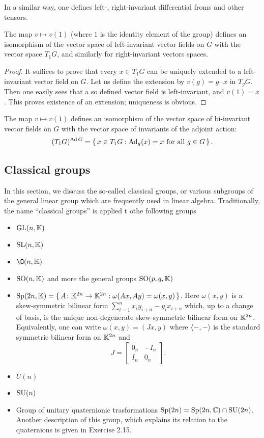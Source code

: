 In a similar way, one defines left-, right-invariant differential froms and
other tensors.

\begin{theorem}
  The map $v\mapsto v(1)$ (where $1$ is the identity element of the
  group) defines an isomorphism of the vector space of left-invariant
  vector fields on $G$ with the vector space $T_1G$, and similarly for
  right-invariant vectors spaces.
\end{theorem}

\begin{proof}
  It suffices to prove that every $x\in T_1G$ can be uniquely extended to a
  left-invariant vector field on $G$. Let us define the extension by
  $v(g)=g\cdot x$ in $T_gG$. Then one easily sees that a so defined
  vector field is left-invariant, and $v(1)=x$. This proves existence of
  an extension; uniqueness is obvious.
\end{proof}

\begin{theorem}
  The map $v\mapsto v(1)$ defines an isomorphism of the vector space
  of bi-invariant vector fields on $G$ with the vector space of invariants
  of the adjoint action:
  \[
    (T_1G)^{\operatorname{Ad} G}=\left\{\,x\in T_1G:\text{$\operatorname{Ad}_g(x)=x$ for all
        $g\in G$}\,\right\}.
  \]
\end{theorem}

\subsection{Classical groups}
In this section, we discuss the so-called classical groups, or various
subgroups of the general linear group which are frequently used in linear
algebra. Traditionally, the name ``classical groups'' is applied t othe
following groups
\begin{itemize}
\item $\mathrm{GL}(n,\mathbb{K})$
\item $\mathrm{SL}(n,\mathbb{K})$
\item $\O(n,\bbK)$
\item $\mathrm{SO}(n,\mathbb{K})$ and more the general groups $\mathrm{SO}(p,q,\mathbb{K})$
\item
  $\mathrm{Sp}(2n,\mathbb{K})=\{\,A\colon\mathbb{K}^{2n}\to\mathbb{K}^{2n}:\omega(Ax,Ay)=\omega(x,y)\,\}$. Here
  $\omega(x,y)$ is a skew-symmetric bilinear form
  $\sum_{i=1}^n x_iy_{i+n}-y_ix_{i+n}$ which, up to a change of basis, is
  the unique non-degenerate skew-symmetric bilinear form on
  $\mathbb{K}^{2n}$. Equivalently, one can write $\omega(x,y)=(Jx,y)$
  where $\langle {-},{-} \rangle$ is the standard symmetric bilinear
  form on $\mathbb{K}^{2n}$ and
  \[
    J=
    \begin{bmatrix}
      0_n&-I_n\\
      I_n&0_n
    \end{bmatrix}.
  \]
\item $U(n)$
\item $\mathrm{SU}(n)$
\item Group of unitary quaternionic trasformations
  $\mathrm{Sp}(2n)=\mathrm{Sp}(2n,\mathbb{C})\cap\mathrm{SU}(2n)$. Another description of this group,
  which explains its relation to the quaternions is given in Exercise
  2.15.
\end{itemize}

